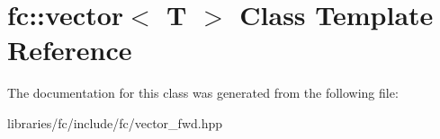 \hypertarget{classfc_1_1vector}{}\section{fc\+:\+:vector$<$ T $>$ Class Template Reference}
\label{classfc_1_1vector}


The documentation for this class was generated from the following file\+:\begin{DoxyCompactItemize}
\item 
libraries/fc/include/fc/vector\+\_\+fwd.\+hpp\end{DoxyCompactItemize}
